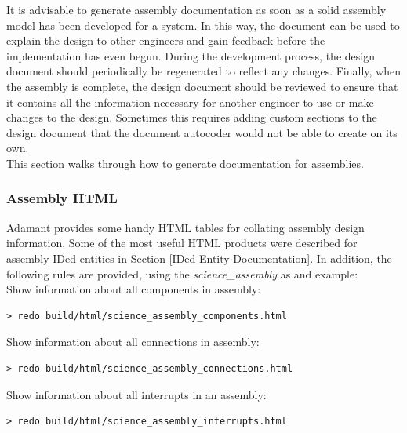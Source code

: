 It is advisable to generate assembly documentation as soon as a solid assembly model has been developed for a system. In this way, the document can be used to explain the design to other engineers and gain feedback before the implementation has even begun. During the development process, the design document should periodically be regenerated to reflect any changes. Finally, when the assembly is complete, the design document should be reviewed to ensure that it contains all the information necessary for another engineer to use or make changes to the design. Sometimes this requires adding custom sections to the design document that the document autocoder would not be able to create on its own. \\

This section walks through how to generate documentation for assemblies.

\subsubsection{Assembly HTML}

Adamant provides some handy HTML tables for collating assembly design information. Some of the most useful HTML products were described for assembly IDed entities in Section \ref{IDed Entity Documentation}. In addition, the following rules are provided, using the \textit{science\_assembly} as and example: \\

Show information about all components in assembly: \\
\begin{verbatim}
> redo build/html/science_assembly_components.html
\end{verbatim}
\vspace{7mm} %

Show information about all connections in assembly: \\
\begin{verbatim}
> redo build/html/science_assembly_connections.html
\end{verbatim}
\vspace{7mm} %

Show information about all interrupts in an assembly: \\
\begin{verbatim}
> redo build/html/science_assembly_interrupts.html
\end{verbatim}
\vspace{7mm} %


